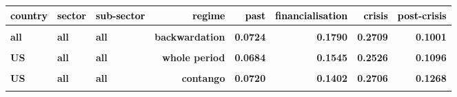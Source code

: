 \documentclass[
  authoryear,
  preprint,
  3p]{elsarticle}
\begin{document}
\begin{longtable}[t]{>{}l>{}l>{}l>{}r>{}r>{}r>{}r>{}r}
\toprule
\textcolor{black}{\textbf{country}} & \textcolor{black}{\textbf{sector}} & \textcolor{black}{\textbf{sub-sector}} & \textcolor{black}{\textbf{regime}} & \textcolor{black}{\textbf{past}} & \textcolor{black}{\textbf{financialisation}} & \textcolor{black}{\textbf{crisis}} & \textcolor{black}{\textbf{post-crisis}}\\
\midrule
\textbf{\cellcolor{gray!10}{all}} & \textbf{\cellcolor{gray!10}{all}} & \textbf{\cellcolor{gray!10}{all}} & \textbf{\cellcolor{gray!10}{whole period}} & \textcolor[HTML]{4285f4}{\textbf{\cellcolor{gray!10}{0.0737}}} & \textcolor[HTML]{4285f4}{\textbf{\cellcolor{gray!10}{0.1638}}} & \textcolor[HTML]{4285f4}{\textbf{\cellcolor{gray!10}{0.2849}}} & \textcolor[HTML]{4285f4}{\textbf{\cellcolor{gray!10}{0.1282}}}\\
\textbf{all} & \textbf{all} & \textbf{all} & \textbf{backwardation} & \textcolor[HTML]{4285f4}{\textbf{0.0724}} & \textcolor[HTML]{4285f4}{\textbf{0.1790}} & \textcolor[HTML]{4285f4}{\textbf{0.2709}} & \textcolor[HTML]{4285f4}{\textbf{0.1001}}\\
\textbf{\cellcolor{gray!10}{all}} & \textbf{\cellcolor{gray!10}{all}} & \textbf{\cellcolor{gray!10}{all}} & \textbf{\cellcolor{gray!10}{contango}} & \textcolor[HTML]{4285f4}{\textbf{\cellcolor{gray!10}{0.0748}}} & \textcolor[HTML]{4285f4}{\textbf{\cellcolor{gray!10}{0.1501}}} & \textcolor[HTML]{4285f4}{\textbf{\cellcolor{gray!10}{0.2985}}} & \textcolor[HTML]{4285f4}{\textbf{\cellcolor{gray!10}{0.1495}}}\\
\textbf{US} & \textbf{all} & \textbf{all} & \textbf{whole period} & \textcolor[HTML]{4285f4}{\textbf{0.0684}} & \textcolor[HTML]{4285f4}{\textbf{0.1545}} & \textcolor[HTML]{4285f4}{\textbf{0.2526}} & \textcolor[HTML]{4285f4}{\textbf{0.1096}}\\
\textbf{\cellcolor{gray!10}{US}} & \textbf{\cellcolor{gray!10}{all}} & \textbf{\cellcolor{gray!10}{all}} & \textbf{\cellcolor{gray!10}{backwardation}} & \textcolor[HTML]{4285f4}{\textbf{\cellcolor{gray!10}{0.0642}}} & \textcolor[HTML]{4285f4}{\textbf{\cellcolor{gray!10}{0.1697}}} & \textcolor[HTML]{4285f4}{\textbf{\cellcolor{gray!10}{0.2323}}} & \textcolor[HTML]{4285f4}{\textbf{\cellcolor{gray!10}{0.0859}}}\\
\addlinespace
\textbf{US} & \textbf{all} & \textbf{all} & \textbf{contango} & \textcolor[HTML]{4285f4}{\textbf{0.0720}} & \textcolor[HTML]{4285f4}{\textbf{0.1402}} & \textcolor[HTML]{4285f4}{\textbf{0.2706}} & \textcolor[HTML]{4285f4}{\textbf{0.1268}}\\
\textbf{\cellcolor{gray!10}{US}} & \textbf{\cellcolor{gray!10}{agriculturals}} & \textbf{\cellcolor{gray!10}{all}} & \textbf{\cellcolor{gray!10}{whole period}} & \textcolor[HTML]{4285f4}{\textbf{\cellcolor{gray!10}{0.0910}}} & \textcolor[HTML]{4285f4}{\textbf{\cellcolor{gray!10}{0.1305}}} & \textcolor[HTML]{4285f4}{\textbf{\cellcolor{gray!10}{0.2322}}} & \textcolor[HTML]{4285f4}{\textbf{\cellcolor{gray!10}{0.1075}}}\\

\end{longtable}
\end{document}
